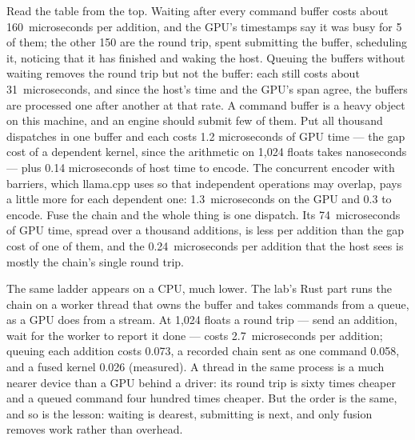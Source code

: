 
Read the table from the top. Waiting after every command buffer costs about
160~microseconds per addition, and the GPU's timestamps say it was busy for 5
of them; the other 150 are the round trip, spent submitting the buffer,
scheduling it, noticing that it has finished and waking the host. Queuing the
buffers without waiting removes the round trip but not the buffer: each still
costs about 31~microseconds, and since the host's time and the GPU's span
agree, the buffers are processed one after another at that rate. A command
buffer is a heavy object on this machine, and an engine should submit few of
them. Put all thousand dispatches in one buffer and each costs 1.2
microseconds of GPU time --- the gap cost of a dependent kernel, since the
arithmetic on 1,024 floats takes nanoseconds --- plus 0.14 microseconds of host
time to encode. The concurrent encoder with barriers, which llama.cpp uses so
that independent operations may overlap, pays a little more for each dependent
one: 1.3~microseconds on the GPU and 0.3 to encode. Fuse the chain and the
whole thing is one dispatch. Its 74~microseconds of GPU time, spread over a
thousand additions, is less per addition than the gap cost of one of them, and
the 0.24~microseconds per addition that the host sees is mostly the chain's
single round trip.

The same ladder appears on a CPU, much lower. The lab's Rust part runs the
chain on a worker thread that owns the buffer and takes commands from a queue,
as a GPU does from a stream. At 1,024 floats a round trip --- send an addition,
wait for the worker to report it done --- costs 2.7~microseconds per addition;
queuing each addition costs 0.073, a recorded chain sent as one command 0.058,
and a fused kernel 0.026 (measured). A thread in the same process is a much
nearer device than a GPU behind a driver: its round trip is sixty times cheaper
and a queued command four hundred times cheaper. But the order is the same,
and so is the lesson: waiting is dearest, submitting is next, and only fusion
removes work rather than overhead.

